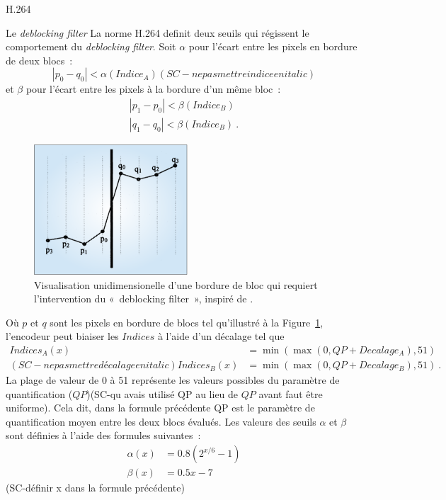 \documentclass{article}
\begin{document}
\begin{section}{H.264}
\begin{subsection}{Le \textit{deblocking filter}}
La norme H.264 definit deux seuils qui régissent le comportement du 
\textit{deblocking filter}. Soit $\alpha$ pour l'écart entre les pixels en
bordure de deux blocs~:
\begin{equation}
\left| p_0 - q_0 \right| < \alpha(Indice_A)  (SC-ne pas mettre indice en italic)
\end{equation}
et $\beta$ pour l'écart entre les pixels à la bordure d'un même bloc~:
\begin{align}
\left| p_1 - p_0 \right| < \beta(Indice_B)\\
\left| q_1 - q_0 \right| < \beta(Indice_B)\:.
\end{align}
\begin{figure}[htb]
\centering
\includegraphics[scale=0.65]{images/BlockyEdge.png}
\caption{Visualisation unidimensionelle d'une bordure de bloc qui requiert
l'intervention du «~deblocking filter~», inspiré de \cite{list2003}.}
\label{fig-BlockyEdge}
\end{figure}
Où $p$ et $q$ sont les pixels en bordure de blocs tel qu'illustré à la
Figure~\ref{fig-BlockyEdge}, l'encodeur peut biaiser les $Indices$ à l'aide 
d'un
décalage tel que
\begin{align}
Indices_A(x) &= \min(\max(0,QP+Decalage_A), 51)\\ (SC-ne pas mettre décalage en italic)
Indices_B(x) &= \min(\max(0,QP+Decalage_B), 51)\:.
\end{align}
La plage de valeur de 0 à 51 représente les valeurs possibles du paramètre de
quantification ($QP$)(SC-qu avais utilisé QP au lieu de $QP$ avant faut être uniforme). Cela dit, dans la formule précédente QP est le paramètre
de quantification moyen entre les deux blocs évalués. Les valeurs des seuils
$\alpha$ et $\beta$ sont définies à l'aide des formules suivantes~:
\begin{align}
\alpha(x) &= 0.8(2^{x/6}-1)\\
\beta(x) &= 0.5x-7
\end{align}
(SC-définir x dans la formule précédente)


\end{subsection}
\end{section}
\end{document}

